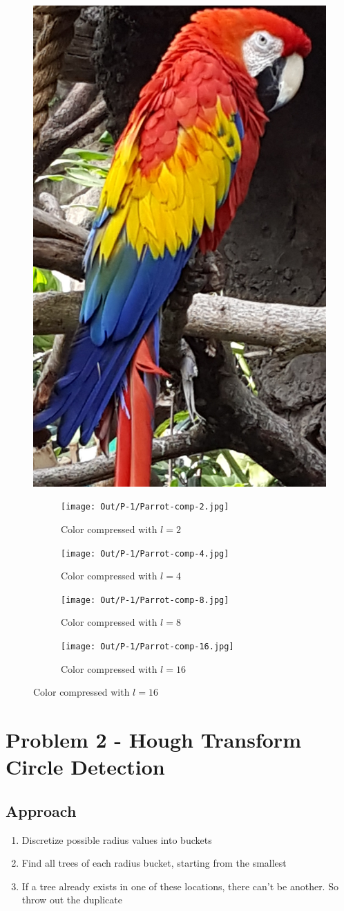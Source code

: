 \documentclass[dvipsnames]{article}
\begin{document}
\begin{figure}[H]
	\centering\includegraphics[height=.5\linewidth]{Images/P-1/Parrot.jpg}
	\caption{Original Parrot.jpg}

	\begin{subfigure}{.33\linewidth}
		\centering\texttt{[image: Out/P-1/Parrot-comp-2.jpg]}
		\caption{Color compressed with $l = 2$}
	\end{subfigure}
	\begin{subfigure}{.33\linewidth}
		\centering\texttt{[image: Out/P-1/Parrot-comp-4.jpg]}
		\caption{Color compressed with $l = 4$}
	\end{subfigure}
	\begin{subfigure}{.33\linewidth}
		\centering\texttt{[image: Out/P-1/Parrot-comp-8.jpg]}
		\caption{Color compressed with $l = 8$}
	\end{subfigure}
	\begin{subfigure}{.33\linewidth}
		\centering\texttt{[image: Out/P-1/Parrot-comp-16.jpg]}
		\caption{Color compressed with $l = 16$}
	\end{subfigure}
\end{figure}

\section*{Problem 2 - Hough Transform Circle Detection}
\subsection*{Approach}

\begin{enumerate}
	\item Discretize possible radius values into buckets
	\item Find all trees of each radius bucket, starting from the smallest
	\item If a tree already exists in one of these locations, there can't be another. So throw out the duplicate
\end{enumerate}
\end{document}
